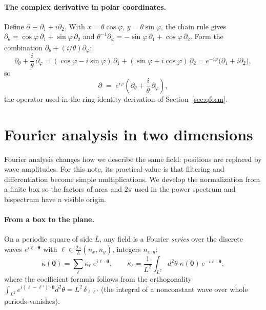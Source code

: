 \documentclass[11pt]{article}
\newcommand{\btheta}{\boldsymbol{\theta}}
\newcommand{\bell}{\boldsymbol{\ell}}
\numberwithin{equation}{section}
\begin{document}
\paragraph{The complex derivative in polar coordinates.}
Define $\partial \equiv \partial_1 + i\partial_2$.  With
$x = \theta\cos\varphi$, $y = \theta\sin\varphi$, the chain rule
gives
$\partial_\theta = \cos\varphi\,\partial_1 +
\sin\varphi\,\partial_2$ and
$\theta^{-1}\partial_\varphi = -\sin\varphi\,\partial_1 +
\cos\varphi\,\partial_2$.  Form the combination
$\partial_\theta + (i/\theta)\partial_\varphi$:
\begin{equation}
  \partial_\theta + \frac{i}{\theta}\,\partial_\varphi
  = (\cos\varphi - i\sin\varphi)\,\partial_1
  + (\sin\varphi + i\cos\varphi)\,\partial_2
  = e^{-i\varphi}\bigl(\partial_1 + i\partial_2\bigr) ,
  \label{eq:polarchain}
\end{equation}
so
\begin{equation}
  \partial
  \;=\; e^{i\varphi}
  \left(\partial_\theta
  + \frac{i}{\theta}\,\partial_\varphi\right) ,
  \label{eq:polarderiv}
\end{equation}
the operator used in the ring-identity derivation of
Section~\ref{sec:qform}.

\section{Fourier analysis in two dimensions}
\label{app:fourier}

Fourier analysis changes how we describe the same field: positions are
replaced by wave amplitudes. For this note, its practical value is that
filtering and differentiation become simple multiplications. We develop
the normalization from a finite box so the factors of area and $2\pi$
used in the power spectrum and bispectrum have a visible origin.

\paragraph{From a box to the plane.}
On a periodic square of side $L$, any field is a Fourier
\emph{series} over the discrete waves
$e^{i\bell\cdot\btheta}$ with
$\bell \in \frac{2\pi}{L}(n_x, n_y)$, integers $n_{x,y}$:
\begin{equation}
  \kappa(\btheta)
  = \sum_{\bell} \kappa_{\bell}\; e^{i\bell\cdot\btheta},
  \qquad
  \kappa_{\bell}
  = \frac{1}{L^2}\int_{L^2} d^2\theta\;
  \kappa(\btheta)\, e^{-i\bell\cdot\btheta} ,
  \label{eq:fourierseries}
\end{equation}
where the coefficient formula follows from the orthogonality
$\int_{L^2} e^{i(\bell - \bell')\cdot\btheta} d^2\theta =
L^2\,\delta_{\bell\bell'}$ (the integral of a nonconstant wave over
whole periods vanishes).
\end{document}
